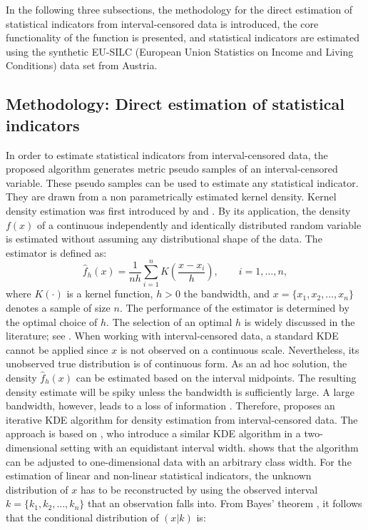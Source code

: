 In the following three subsections, the methodology for the direct estimation of statistical indicators from interval-censored data is introduced, the core functionality of the function  is presented, and statistical indicators are estimated using the synthetic EU-SILC (European Union Statistics on Income and Living Conditions) data set from Austria.

\subsection{Methodology: Direct estimation of statistical indicators}

In order to estimate statistical indicators from interval-censored data, the proposed algorithm generates metric pseudo samples of an interval-censored variable. These pseudo samples can be used to estimate any statistical indicator. They are drawn from a non parametrically estimated kernel density. Kernel density estimation was first introduced by \citep{Rosenblatt1956} and \citep{Parzen1962}. By  its application, the density \(f(x)\) of a continuous independently and identically distributed random variable is estimated without assuming any distributional shape of the data. The estimator is defined as: 
\begin{equation*}
            \hat{f}_{h}(x) =\frac{1}{nh}\sum_{i=1}^{n}
                           K\left( \dfrac{x-x_i}{h}  \right), \qquad i=1, \ldots, n,
                                        \label{Eq:KerneldefR}
\end{equation*}
where $K\left(\cdot\right)$ is a kernel function, \(h>0\) the bandwidth, and \(x=\{x_{1},x_{2},\ldots,x_{n}\}\) denotes a sample of size \(n\). The performance of the estimator is determined by the optimal choice of \(h\). The selection of an optimal \(h\) is widely discussed in the literature; see \citet{Jon96, Loa99, Zam12}. When working with interval-censored data, a standard KDE cannot be applied since \(x\) is not observed on a continuous scale. Nevertheless, its unobserved true distribution is of continuous form. As an ad hoc solution, the density \(\hat{f}_{h}\left(x\right)\) can be estimated based on the interval midpoints. The resulting density estimate will be spiky unless the bandwidth is sufficiently large. A large bandwidth, however, leads to a loss of information \citep{Wan13}.  Therefore, \citet{Wal19} proposes an iterative KDE algorithm for density estimation from interval-censored data. The approach is based on \citet{Gro17}, who introduce a similar KDE algorithm in a two-dimensional setting with an equidistant interval width. \citet{Wal19} shows that the algorithm can  be adjusted to one-dimensional data with an arbitrary class width. For the estimation of linear and non-linear statistical indicators, the unknown distribution of \(x\) has to be reconstructed by using the observed interval \(k=\{k_{1}, k_{2}, \ldots ,k_{n}\}\) that an observation falls into. From Bayes' theorem \citep{Bay63}, it follows that the conditional distribution of \(\left(x|k\right)\) is:
